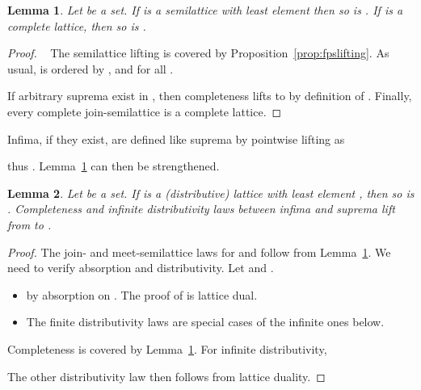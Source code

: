 \documentclass[12pt]{article}
\newtheorem{lemma}{Lemma}
\theoremstyle{definition}
\newcommand{\reflem}[1]{Lem\-ma~\ref{#1}}
\begin{document}
\begin{lemma}\label{lem:semilattice-lifting}
  Let  be a set. If  is a semilattice with least element
   then so is . If  is a complete lattice, then so is
  .
\end{lemma}
\begin{proof}~ The semilattice lifting is covered by
  Proposition~\ref{prop:fpslifting}. As usual,  is ordered by
  , and  for all .

  If arbitrary suprema exist in , then completeness lifts to
   by definition of .  Finally, every complete
  join-semilattice is a complete lattice.
\end{proof}

Infima, if they exist, are defined like suprema by pointwise lifting as

thus . \reflem{lem:semilattice-lifting} can then be strengthened.
\begin{lemma}\label{lem:lattice-lifting}
  Let  be a set. If  is a (distributive) lattice with
  least element , then so is . Completeness and infinite distributivity laws between infima and suprema lift from  to .
\end{lemma}
\begin{proof}
  The join- and meet-semilattice laws for  and  follow from
  Lemma~\ref{lem:semilattice-lifting}. We need to verify absorption
  and distributivity. Let  and .
  \begin{itemize}
  \item  by
    absorption on . The proof of  is lattice dual.
  \item The finite distributivity laws are special cases of the
    infinite ones below.
  \end{itemize}
  Completeness is covered by \reflem{lem:semilattice-lifting}. For
  infinite distributivity,
 
The other distributivity law then follows from lattice duality.
\end{proof}
\end{document}
